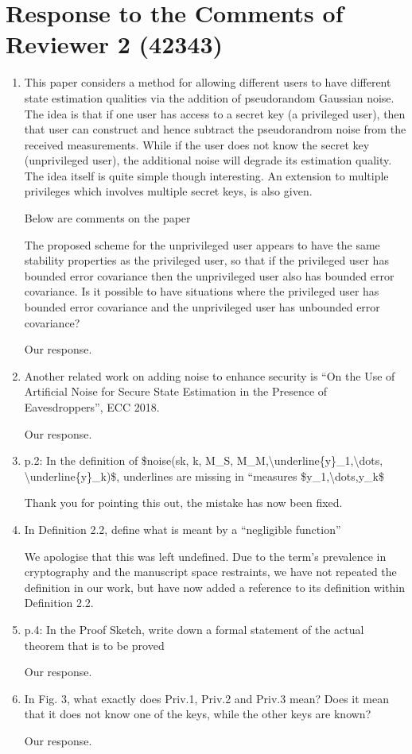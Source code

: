 \documentclass[a4paper]{scrartcl}
\newenvironment{rebuttal}{\begin{enumerate}[label={\color{grey}\thesection.\arabic{enumi}},leftmargin=0pt,ref=\thesection.\arabic{enumi}]}{\end{enumerate}}
\newcommand{\reviewtext}[1]{{\color{nblue} #1}}
\begin{document}
\section*{Response to the Comments of Reviewer 2 (42343)}
\def\thesection{R2}
\begin{rebuttal}
\item \reviewtext{This paper considers a method for allowing different users to have different state estimation qualities via the addition of pseudorandom Gaussian noise. The idea is that if one user has access to a secret key (a privileged user), then that user can construct and hence subtract the pseudorandrom noise from the received measurements. While if the user does not know the secret key (unprivileged user), the additional noise will degrade its estimation quality. The idea itself is quite simple though interesting. An extension to multiple privileges which involves multiple secret keys, is also given. 

Below are comments on the paper

The proposed scheme for the unprivileged user appears to have the same stability properties as the privileged user, so that if the privileged user has bounded error covariance then the unprivileged user also has bounded error covariance. Is it possible to have situations where the privileged user has bounded error covariance and the unprivileged user has unbounded error covariance?}

Our response.

\item \reviewtext{Another related work on adding noise to enhance security is ``On the Use of Artificial Noise for Secure State Estimation in the Presence of Eavesdroppers'', ECC 2018.}

Our response.

\item \reviewtext{p.2: In the definition of \$noise(sk, k, M\_S, M\_M,\textbackslash underline\{y\}\_1,\textbackslash dots, \textbackslash underline\{y\}\_k)\$, underlines are missing in ``measures \$y\_1,\textbackslash dots,y\_k\$}

Thank you for pointing this out, the mistake has now been fixed.

\item \reviewtext{In Definition 2.2, define what is meant by a ``negligible function''}

We apologise that this was left undefined. Due to the term's prevalence in cryptography and the manuscript space restraints, we have not repeated the definition in our work, but have now added a reference to its definition within Definition 2.2.

\item \reviewtext{p.4: In the Proof Sketch, write down a formal statement of the actual theorem that is to be proved}

Our response.

\item \reviewtext{In Fig. 3, what exactly does  Priv.1, Priv.2 and Priv.3 mean? Does it
mean that it does not know one of the keys, while the other keys are
known?}

Our response.

\end{rebuttal}
\end{document}
